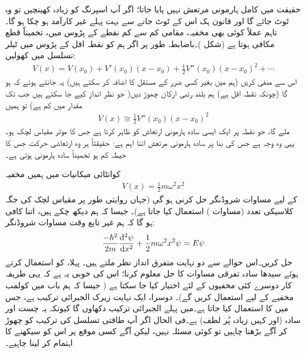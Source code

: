 حقیقت میں کامل ہارمونی مرتعش نہیں پایا جاتا؛ اگر آپ اسپرنگ کو زیادہ کھینچیں تو وہ ٹوٹ جائے گا اور قانون ہک اس کے ٹوٹ جانے سے بہت پہلے غیر کارآمد ہو چکا ہو گا۔ تاہم عملاً کوئی بھی مخفیہ، مقامی کم سے کم نقطے کے پڑوس میں، تخمیناً قطع مکافی ہوتا ہے (شکل )۔باضابطہ طور پر اگر ہم  کو نقطہ اقل کے پڑوس میں ٹیلر تسلسل میں کھولیں:
\begin{align*}
V(x)=V( x_{0})+V'(x_{0})(x-x_{0})+\frac{1}{2}V''(x_{0})(x-x_{0})^{2}+\cdots
\end{align*}
اس سے  منفی کریں (ہم  میں بغیر کسی ضرر کے مستقل کا اضافہ کر سکتے ہیں) یہ جانتے ہوئے کہ  ہو گا (چونکہ  نقطہ اقل ہے) ہم بلند رتبی ارکان چھوڑ دیں( جو نظر انداز کیے جا سکتے ہیں جب تک  مقدار میں کم ہے) تو ہمیں
\begin{align*}
V(x)\cong\frac{1}{2}V''(x_{0})(x-x_{0})^{2}
\end{align*} 
ملے گا، جو نقطہ  پر ایک ایسی سادہ ہارمونی ارتعاش کو ظاہر کرتا ہے جس کا موثر مقیاس لچک  ہو۔ یہی وہ وجہ ہے جس کی بنا پر سادہ ہارمونی مرتعش اتنا اہم ہے: حقیقتاً ہر وہ ارتعاشی حرکت جس کا حیطہ کم ہو تخمیناً سادہ ہارمونی ہوتی ہے۔

کوانٹائی میکانیات میں ہمیں مخفیہ
\begin{align}\label{مساوات_شروڈنگر_مخفیہ_ہارمونی}
V(x)=\frac{1}{2}m\omega ^{2}x^{2}
\end{align}
کے لیے مساوات شروڈنگر حل کرنی ہو گی (جہاں روایتی طور پر مقیاس لچک کی جگہ کلاسیکی تعدد (مساوات ) استعمال کیا جاتا ہے)۔ جیسا کہ ہم دیکھ چکے ہیں، اتنا کافی ہو گا کہ ہم غیر تابع وقت مساوات شروڈنگر:
\begin{align}\label{مساوات_شروڈنگر_مخفی_قوہ_الف}
\frac{-\hslash ^{2}}{2m}\frac{\dif{^{2}\psi}}{\dif{x^{2}}}+\frac{1}{2}m\omega ^{2}x^{2}\psi=E\psi
\end{align}
حل کریں۔اس حوالے سے دو نہایت متفرق انداز نظر ملتے ہیں۔ پہلا،  کو استعمال کرتے ہوئے  سیدھا سادہ تفرقی مساوات کا حل معلوم کرنا؛ اس کی خوبی یہ ہے کہ یہی طریقہ کار دوسرے کئی مخفیوں کے لئے اختیار کیا جا سکتا ہے ( جیسا کہ ہم باب  میں کولمب مخفیے کے لیے استعمال کریں گے)۔ دوسرا، ایک نہایت زیرک الجبرائی ترکیب ہے، جس میں  کا استعمال کیا جاتا ہے۔میں پہلے الجبرائی ترکیب دکھاوں گا کیونکہ یہ چست اور سادہ (اور کہیں زیادہ پُر لطف) ہے۔فی الحال اگر آپ طاقتی تسلسل کی ترکیب کو چھوڑ کر آگے بڑھنا چاہیں تو کوئی مسئلہ نہیں، لیکن آگے کسی موقع پر اس کو سیکھنے کا اہتمام کر لینا چاہیے۔ 

